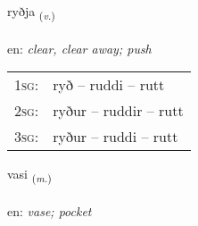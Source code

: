 \documentclass[frontgrid, backgrid]{flacards}\usepackage[]{graphicx}\usepackage[]{xcolor}
\begin{document}
\renewcommand{\flhead}{\vskip5pt \fboxsep=0pt {\small\bfseries\footnotesize Sagnorð | Verb}}
\renewcommand{\fcfoot}{\vskip5pt \fboxsep=0pt \hspace{2pt}{\small\bfseries\footnotesize 3K}}

\renewcommand{\blhead}{\vskip5pt {\small\bfseries\footnotesize Sagnorð | Verb }}
\renewcommand{\bcfoot}{\vskip5pt \hspace{2pt}{\small\bfseries\footnotesize 3K}}


{ryðja \small{\textsubscript{(\textit{v.})}} \\[1ex] %
\textphonetic{[rɪðja]} \\
en: \emph{clear, clear away; push} \\  [2ex]
\renewcommand*{\arraystretch}{0.8}
\begin{tabular}{p{1cm}l}
\textsc{1sg}: & ryð -- ruddi -- rutt \\ 
\textsc{2sg}: & ryður -- ruddir -- rutt \\ 
\textsc{3sg}: & ryður -- ruddi -- rutt \\ 
\end{tabular}
}

\renewcommand{\flhead}{\vskip5pt \fboxsep=0pt {\small\bfseries\footnotesize Nafnorð | Noun}}
\renewcommand{\fcfoot}{\vskip5pt \fboxsep=0pt \hspace{2pt}{\small\bfseries\footnotesize 3K}}

\renewcommand{\blhead}{\vskip5pt {\small\bfseries\footnotesize Nafnorð | Noun }}
\renewcommand{\bcfoot}{\vskip5pt \hspace{2pt}{\small\bfseries\footnotesize 3K}}


{vasi \small{\textsubscript{(\textit{m.})}} \\[1ex] %
\textphonetic{[vaːsɪ]} \\
en: \emph{vase; pocket} \\  [2ex]
\renewcommand*{\arraystretch}{0.8}
}
\end{document}
